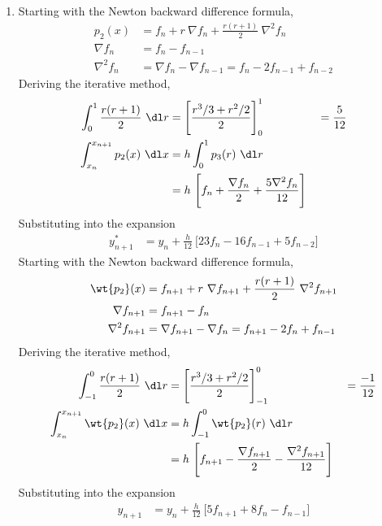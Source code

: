 \begin{enumerate}
    \item Starting with the Newton backward difference formula,
          \begin{align}
              p_2(x)       & = f_n + r\ \nabla f_n + \frac{r(r+1)}{2}\ \nabla^2 f_n \\
              \nabla f_n   & = f_{n} - f_{n-1}                                      \\
              \nabla^2 f_n & = \nabla f_n - \nabla f_{n-1} =
              f_n - 2 f_{n-1} + f_{n-2}
          \end{align}
          Deriving the iterative method,
          \begin{align}
              \int_{0}^{1} \frac{r(r+1)}{2}\ \dl r      & =
              \Bigg[ \frac{r^3/3 + r^2/2}{2} \Bigg]_0^1 &
                                                        & = \frac{5}{12} \\
              \int_{x_n}^{x_{n+1}}p_2(x)\ \dl x         & =
              h\int_{0}^{1} p_3(r)\ \dl r                                \\
                                                        &
              = h\ \Bigg[ f_n + \frac{\nabla f_n}{2} + \frac{5\nabla^2 f_n}{12}
                  \Bigg]
          \end{align}
          Substituting into the expansion
          \begin{align}
              y^*_{n+1} & = y_n + \frac{h}{12}
              \ \Bigg[ 23f_n - 16f_{n-1} + 5f_{n-2} \Bigg]
          \end{align}
          Starting with the Newton backward difference formula,
          \begin{align}
              \wt{p_2}(x)      & = f_{n+1} + r\ \nabla f_{n+1} + \frac{r(r+1)}{2}
              \ \nabla^2 f_{n+1}                                                  \\
              \nabla f_{n+1}   & = f_{n+1} - f_{n}                                \\
              \nabla^2 f_{n+1} & = \nabla f_{n+1} - \nabla f_{n} =
              f_{n+1} - 2 f_{n} + f_{n-1}
          \end{align}
          Deriving the iterative method,
          \begin{align}
              \int_{-1}^{0} \frac{r(r+1)}{2}\ \dl r        & =
              \Bigg[ \frac{r^3/3 + r^2/2}{2} \Bigg]_{-1}^0 &
                                                           & = \frac{-1}{12} \\
              \int_{x_n}^{x_{n+1}} \wt{p_2}(x)\ \dl x      & =
              h\int_{-1}^{0} \wt{p_2}(r)\ \dl r                              \\
                                                           &
              = h\ \Bigg[ f_{n+1} - \frac{\nabla f_{n+1}}{2}
                  - \frac{\nabla^2 f_{n+1}}{12} \Bigg]
          \end{align}
          Substituting into the expansion
          \begin{align}
              y_{n+1} & = y_n + \frac{h}{12}
              \ \Bigg[ 5f_{n+1} + 8f_n - f_{n-1} \Bigg]
          \end{align}


\end{enumerate}
